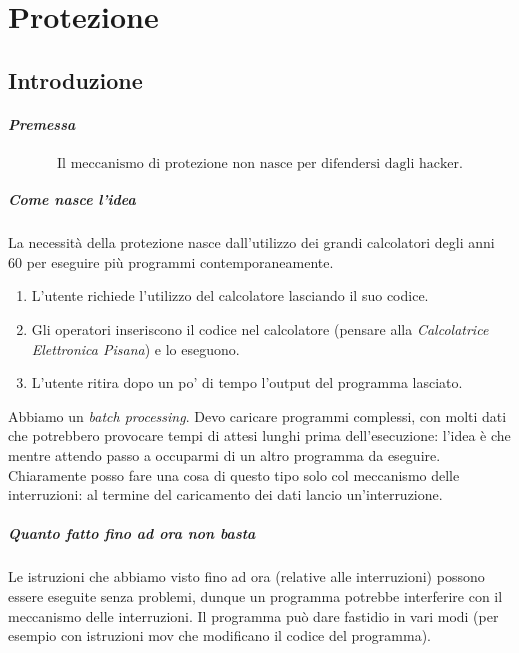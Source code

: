 
\chapter{Protezione}
\section{Introduzione}
\paragraph{Premessa} \[\boxed{\text{Il meccanismo di protezione non nasce per difendersi dagli hacker.}}\]
\paragraph{Come nasce l'idea} La necessità della protezione nasce dall'utilizzo dei grandi calcolatori degli anni $60$ per eseguire più programmi contemporaneamente. 
\begin{enumerate}
	\item L'utente richiede l'utilizzo del calcolatore lasciando il suo codice.
	\item Gli operatori inseriscono il codice nel calcolatore (pensare alla \emph{Calcolatrice Elettronica Pisana}) e lo eseguono.
	\item L'utente ritira dopo un po' di tempo l'output del programma lasciato.
\end{enumerate}
Abbiamo un \emph{batch processing}. Devo caricare programmi complessi, con molti dati che potrebbero provocare tempi di attesi lunghi prima dell'esecuzione: l'idea è che mentre attendo passo a occuparmi di un altro programma da eseguire. Chiaramente posso fare una cosa di questo tipo solo col meccanismo delle interruzioni: al termine del caricamento dei dati lancio un'interruzione. 
\paragraph{Quanto fatto fino ad ora non basta} Le istruzioni che abbiamo visto fino ad ora (relative alle interruzioni) possono essere eseguite senza problemi, dunque un programma potrebbe interferire con il meccanismo delle interruzioni. Il programma può dare fastidio in vari modi (per esempio con istruzioni mov che modificano il codice del programma).
